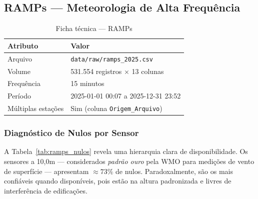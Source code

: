 \documentclass[12pt, a4paper]{article}
\newcommand{\feature}[1]{\texttt{#1}}
\newcommand{\arquivo}[1]{\texttt{#1}}
\begin{document}
\subsection{RAMPs — Meteorologia de Alta Frequência}
\label{subsec:ramps}

\begin{table}[H]
\centering
\caption{Ficha técnica — RAMPs}
\label{tab:ramps_ficha}
\begin{tabular}{@{}ll@{}}
\toprule
\textbf{Atributo}       & \textbf{Valor} \\
\midrule
Arquivo                  & \arquivo{data/raw/ramps\_2025.csv} \\
Volume                   & 531.554 registros $\times$ 13 colunas \\
Frequência               & 15 minutos \\
Período                  & 2025-01-01 00:07 a 2025-12-31 23:52 \\
Múltiplas estações       & Sim (coluna \feature{Origem\_Arquivo}) \\
\bottomrule
\end{tabular}
\end{table}

\subsubsection{Diagnóstico de Nulos por Sensor}

A Tabela~\ref{tab:ramps_nulos} revela uma hierarquia clara de disponibilidade.
Os sensores a 10,0m — considerados \textit{padrão ouro} pela WMO para medições
de vento de superfície — apresentam $\approx 73\%$ de nulos. Paradoxalmente,
são os mais confiáveis quando disponíveis, pois estão na altura padronizada
e livres de interferência de edificações.
\end{document}
